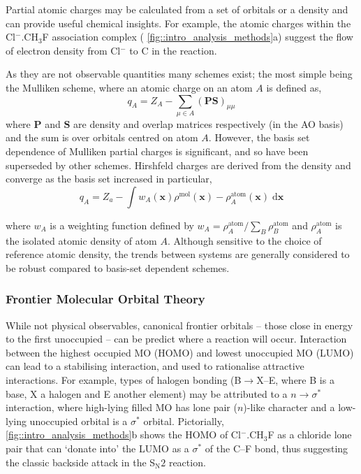 \documentclass[main.tex]{subfiles}
\begin{document}
Partial atomic charges may be calculated from a set of orbitals or a density and can provide useful chemical insights. For example, the atomic charges within the Cl${}^{-}$.CH${}_3$F association complex (\figurename{ \ref{fig::intro_analysis_methods}a}) suggest the flow of electron density from Cl$^{-}$ to C in the reaction.

As they are not observable quantities many schemes exist; the most simple being the Mulliken scheme, where an atomic charge on an atom $A$ is defined as,\cite{SzaboIntro}
\begin{equation}
	q_A = Z_A - \sum_{\mu \in A} (\boldsymbol{P}\boldsymbol{S})_{\mu \mu}
\end{equation}
where $\boldsymbol{P}$ and $\boldsymbol{S}$ are density and overlap matrices respectively (in the AO basis) and the sum is over orbitals centred on atom $A$. However, the basis set dependence of Mulliken partial charges is significant,\cite{Cusachs1968} and so have been superseded by other schemes. Hirshfeld charges are derived from the density and converge as the basis set increased in particular,\cite{Hirshfeld1977}
\begin{equation}
	q_A = Z_a - \int w_A(\boldsymbol{x}) \rho^\text{mol}(\boldsymbol{x}) - \rho^\text{atom}_A(\boldsymbol{x}) \;\text{d}\boldsymbol{x}
\end{equation}

where $w_A$ is a weighting function defined by $w_A = \rho_A^\text{atom}/\sum_B \rho_B^\text{atom}$ and $\rho_A^\text{atom}$ is the isolated atomic density of atom $A$. Although sensitive to the choice of reference atomic density, the trends between systems are generally considered to be robust compared to basis-set dependent schemes.\cite{Saha2008}

	
\subsubsection{Frontier Molecular Orbital Theory}

While not physical observables, canonical frontier orbitals -- those close in energy to the first unoccupied -- can be predict where a reaction will occur.\cite{Fukui1952, Woodward1969, Fukui1982} Interaction between the highest occupied MO (HOMO) and lowest unoccupied MO (LUMO) can lead to a stabilising interaction,\cite{albright2013orbital} and used to rationalise attractive interactions. For example, types of halogen bonding (B$\rightarrow$X--E, where B is a base, X a halogen and E another element) may be attributed to a $n\rightarrow \sigma^*$ interaction, where high-lying filled MO has lone pair ($n$)-like character and a low-lying unoccupied orbital is a $\sigma^*$ orbital.\cite{Cavallo2016} Pictorially, \figurename{ \ref{fig::intro_analysis_methods}b} shows the HOMO of Cl${}^{-}$.CH${}_3$F as a chloride lone pair that can `donate into' the LUMO as a $\sigma^*$ of the C--F bond, thus suggesting the classic backside attack in the S${}_\text{N}2$ reaction.
\end{document}
